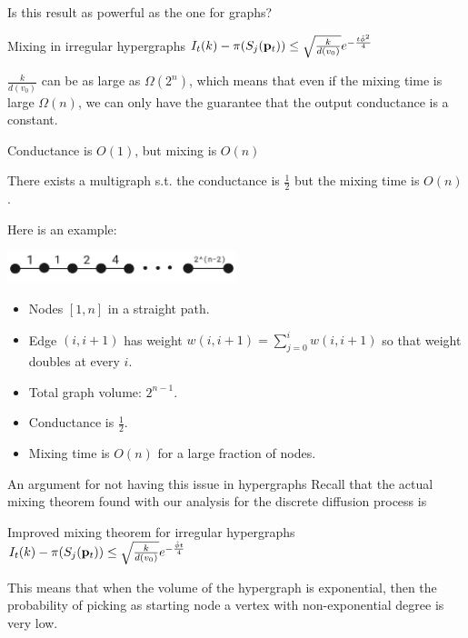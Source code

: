 \documentclass[../main.tex]{subfiles}
\begin{document}
    \begin{frame}{Is this result as powerful as the one for graphs?} 
    	
		\begin{block}{Mixing in irregular hypergraphs}
			$I_t(k) - \pi(S_j(\bold{p}_{t})) \leq \sqrt{\frac{k}{d(v_0)}} e^{-\frac{t\hat{\phi}^2}{4}}$
		\end{block}
	
		$\frac{k}{d(v_0)}$ can be as large as $\Omega(2^n)$, which means that even if the mixing time is large $\Omega(n)$, we can only have the guarantee that the output conductance is a constant.    
	\end{frame}	

	\begin{frame}{Conductance is $O(1)$, but mixing is $O(n)$}
		\begin{lemma}
			There exists a multigraph s.t. the conductance is $\frac{1}{2}$ but the mixing time is $O(n)$.
		\end{lemma}
		Here is an example: \\ 
		\begin{center}
		\includegraphics[width=0.5\textwidth]{Figures/path_graph}
		\end{center}
		\begin{itemize}
			\item Nodes $[1,n]$ in a straight path.
			\item Edge $(i,i+1)$ has weight $w(i,i+1) = \sum_{j=0}^{i} w(i,i+1)$ so that weight doubles at every $i$.
			\item Total graph volume: $2^{n-1}$.
			\item Conductance is $\frac{1}{2}$.
			\item Mixing time is $O(n)$ for a large fraction of nodes.
		\end{itemize}
	\end{frame}

	\begin{frame}{An argument for not having this issue in hypergraphs}
		Recall that the actual mixing theorem found with our analysis for the discrete diffusion process is
		\begin{block}{Improved mixing theorem for irregular hypergraphs}
			$I_t(k) - \pi(S_j(\bold{p}_t)) \leq \sqrt{\frac{k}{d(v_0)}}e^{-\frac{\hat{\phi}t}{
			4}}$
		\end{block}
		This means that when the volume of the hypergraph is exponential, then the probability of picking as starting node a vertex with non-exponential degree is very low.
	\end{frame}
\end{document}
